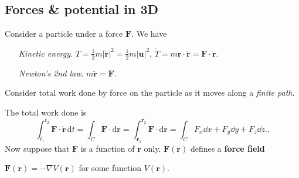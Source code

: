 \subsection{Forces \& potential in 3D}
Consider a particle under a force $ \mathbf{F} $. We have
\begin{enumerate}[align=left]
    \item[\textit{Kinetic energy}.] $ T = \frac{1}{2}m|\dot{\mathbf{r}}|^2 = \frac{1}{2}m |\mathbf{u}|^2 $, $ \dot{T}= m \dot{\mathbf{r}}\cdot \ddot{\mathbf{r}}=\mathbf{F} \cdot \dot{\mathbf{r}} $.
    \item[\textit{Newton's 2nd law}.] $ m \ddot{\mathbf{r}}=\mathbf{F} $.   
\end{enumerate}
Consider total work done by force on the particle as it moves along a \textit{finite path}.
\begin{center}
\end{center}
The total work done is
\[
    \int_{t_1}^{t_2} \mathbf{F} \cdot \dot{\mathbf{r}} \,\mathrm{d}t = \int_C \mathbf{F} \cdot \mathrm{d}\mathbf{r}=\int_{\mathbf{r}_1}^{\mathbf{r}_2} \mathbf{F} \cdot \mathrm{d}\mathbf{r}=\int_C F_x\dd x+F_y\dd y+F_z\dd z..
\]
Now suppose that $\mathbf{F}$ is a function of $\mathbf{r}$ only. $ \mathbf{F}(\mathbf{r}) $ defines a \textbf{force field}

\begin{definition}
    $ \mathbf{F}(\mathbf{r}) = - \nabla V(\mathbf{r}) $ for some function $ V(\mathbf{r}) $.
\end{definition}

